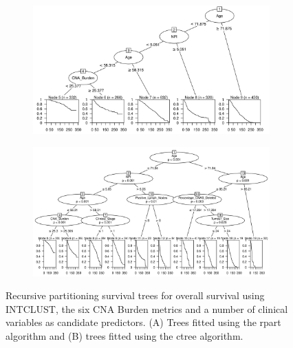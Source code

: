\begin{figure}[!htb]
\centering

\vspace{1cm}

\begin{subfigure}{\textwidth}
\subcaption{}
\includegraphics[width=1\textwidth]{../figures/Appendices/Appendix_B/Clin_PartyKit_Survival_Burden_OS_INTCLUST.png}
\end{subfigure}

\vspace{2cm}

\begin{subfigure}{\textwidth}
\subcaption{}
\includegraphics[width=1\textwidth]{../figures/Appendices/Appendix_B/Clin_Ctree_Survival_Burden_OS_INTCLUST.png}
\end{subfigure}

\vspace{1cm}

\caption[Recursive partitioning survival trees for overall survival using INTCLUST, the six CNA Burden metrics and a number of clinical variables as candidate predictors.]{Recursive partitioning survival trees for overall survival using INTCLUST, the six CNA Burden metrics and a number of clinical variables as candidate predictors. (A) Trees fitted using the rpart algorithm and (B) trees fitted using the ctree algorithm.}
\end{figure}

